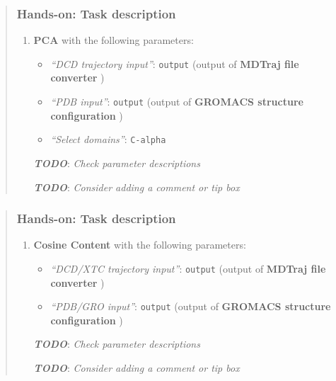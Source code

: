 \documentclass[twocolumn]{bmcart}%
\providecommand{\tightlist}{%
  \setlength{\itemsep}{0pt}\setlength{\parskip}{0pt}}
\providecommand{\tightlist}{%
  \setlength{\itemsep}{0pt}\setlength{\parskip}{0pt}}
\begin{document}
\begin{quote}
\hypertarget{hands-on-task-description-13}{%
\subsubsection{Hands-on: Task
description}\label{hands-on-task-description-13}}

\begin{enumerate}
\def\labelenumi{\arabic{enumi}.}
\tightlist
\item
  \textbf{PCA} with the following parameters:

  \begin{itemize}
  \tightlist
  \item
    \emph{``DCD trajectory input''}: \texttt{output} (output of
    \textbf{MDTraj file converter} )
  \item
    \emph{``PDB input''}: \texttt{output} (output of \textbf{GROMACS
    structure configuration} )
  \item
    \emph{``Select domains''}: \texttt{C-alpha}
  \end{itemize}

  \textbf{\emph{TODO}}: \emph{Check parameter descriptions}

  \textbf{\emph{TODO}}: \emph{Consider adding a comment or tip box}
\end{enumerate}


\end{quote}



\begin{quote}
\hypertarget{hands-on-task-description-14}{%
\subsubsection{Hands-on: Task
description}\label{hands-on-task-description-14}}

\begin{enumerate}
\def\labelenumi{\arabic{enumi}.}
\tightlist
\item
  \textbf{Cosine Content} with the following parameters:

  \begin{itemize}
  \tightlist
  \item
    \emph{``DCD/XTC trajectory input''}: \texttt{output} (output of
    \textbf{MDTraj file converter} )
  \item
    \emph{``PDB/GRO input''}: \texttt{output} (output of \textbf{GROMACS
    structure configuration} )
  \end{itemize}

  \textbf{\emph{TODO}}: \emph{Check parameter descriptions}

  \textbf{\emph{TODO}}: \emph{Consider adding a comment or tip box}
\end{enumerate}


\end{quote}
\end{document}
